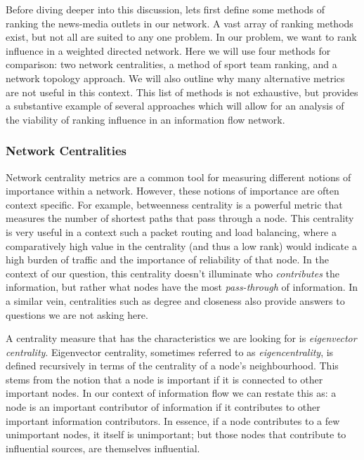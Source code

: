 Before diving deeper into this discussion, lets first define some methods of ranking the news-media outlets in our network. A vast array of ranking methods exist, but not all are suited to any one problem. In our problem, we want to rank influence in a weighted directed network. Here we will use four methods for comparison: two network centralities, a method of sport team ranking, and a network topology approach. We will also outline why many alternative metrics are not useful in this context. This list of methods is not exhaustive, but provides a substantive example of several approaches which will allow for an analysis of the viability of ranking influence in an information flow network. 

\subsubsection{Network Centralities}

Network centrality metrics are a common tool for measuring different notions of importance within a network. However, these notions of importance are often context specific. For example, betweenness centrality is a powerful metric that measures the number of shortest paths that pass through a node. This centrality is very useful in a context such a packet routing and load balancing, where a comparatively high value in the centrality (and thus a low rank) would indicate a high burden of traffic and the importance of reliability of that node. In the context of our question, this centrality doesn't illuminate who \emph{contributes} the information, but rather what nodes have the most \emph{pass-through} of information. In a similar vein, centralities such as degree and closeness also provide answers to questions we are not asking here.

A centrality measure that has the characteristics we are looking for is \emph{eigenvector centrality}. Eigenvector centrality, sometimes referred to as \emph{eigencentrality}, is defined recursively in terms of the centrality of a node's neighbourhood. This stems from the notion that a node is important if it is connected to other important nodes. In our context of information flow we can restate this as: a node is an important contributor of information if it contributes to other important information contributors. In essence, if a node contributes to a few unimportant nodes, it itself is unimportant; but those nodes that contribute to influential sources, are themselves influential.


